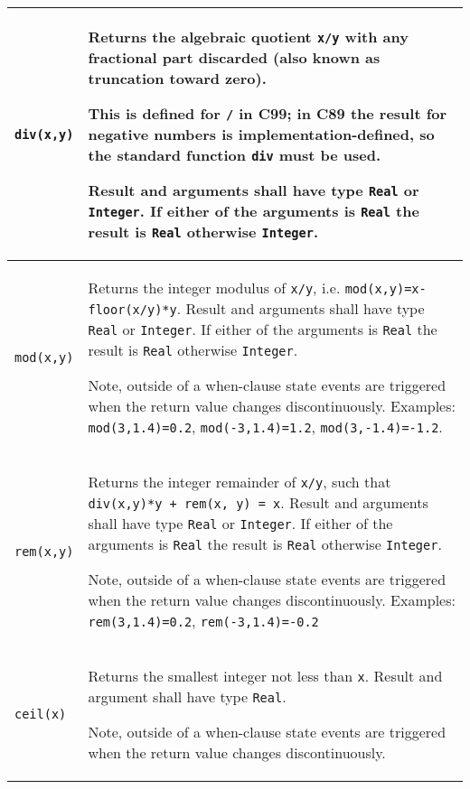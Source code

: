 \begin{longtable}{|p{2cm}|p{12cm}|} \hline
\endhead
\lstinline!div(x,y)! & Returns the algebraic quotient \lstinline!x/y! with any fractional part
discarded (also known as truncation toward zero).
\begin{nonnormative}
This is defined for \lstinline!/! in C99; in C89 the result for negative numbers is implementation-defined, so the standard function \lstinline[language=C]!div! must be used.
\end{nonnormative}
Result and arguments shall have type \lstinline!Real! or \lstinline!Integer!. If
either of the arguments is \lstinline!Real! the result is \lstinline!Real! otherwise
\lstinline!Integer!.\\ \hline
\lstinline!mod(x,y)! & Returns the integer modulus of \lstinline!x/y!, i.e.
\lstinline!mod(x,y)=x-floor(x/y)*y!. Result and arguments shall have type \lstinline!Real! or
\lstinline!Integer!. If either of the arguments is \lstinline!Real! the result is \lstinline!Real! otherwise
\lstinline!Integer!.
\par
\begin{nonnormative*}
Note, outside of a when-clause state events are triggered when the return value changes discontinuously. Examples:
\lstinline!mod(3,1.4)=0.2!, \lstinline!mod(-3,1.4)=1.2!, \lstinline!mod(3,-1.4)=-1.2!.
\end{nonnormative*}
\\ \hline
\lstinline!rem(x,y)! & Returns the integer remainder of \lstinline!x/y!, such that \lstinline!div(x,y)*y + rem(x, y) = x!. Result and arguments shall have type \lstinline!Real! or \lstinline!Integer!. If
either of the arguments is \lstinline!Real! the result is \lstinline!Real! otherwise \lstinline!Integer!.
\par
\begin{nonnormative*}
Note, outside of a when-clause state events are triggered when the return value changes discontinuously. Examples:
\lstinline!rem(3,1.4)=0.2!, \lstinline!rem(-3,1.4)=-0.2!
\end{nonnormative*}
\\ \hline
\lstinline!ceil(x)! & Returns the smallest integer not less than \lstinline!x!. Result and
argument shall have type \lstinline!Real!.
\par
\begin{nonnormative*}
Note, outside of a when-clause state events are triggered when the return value changes discontinuously.
\end{nonnormative*}
\\ \hline

\end{longtable}
